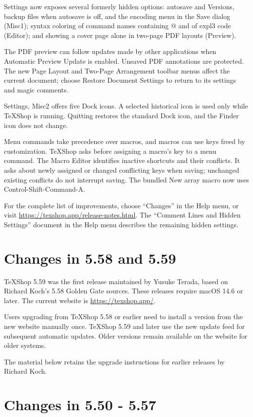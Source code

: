 \documentclass[11pt, oneside]{amsart}
\begin{document}
Settings now exposes several formerly hidden options: autosave and Versions, backup files when autosave is off, and the encoding menu in the Save dialog (Misc1); syntax coloring of command names containing @ and of expl3 code (Editor); and showing a cover page alone in two-page PDF layouts (Preview).

The PDF preview can follow updates made by other applications when Automatic Preview Update is enabled. Unsaved PDF annotations are protected. The new Page Layout and Two-Page Arrangement toolbar menus affect the current document; choose Restore Document Settings to return to its settings and magic comments.

Settings, Misc2 offers five Dock icons. A selected historical icon is used only while TeXShop is running. Quitting restores the standard Dock icon, and the Finder icon does not change.

Menu commands take precedence over macros, and macros can use keys freed by customization. TeXShop asks before assigning a macro's key to a menu command. The Macro Editor identifies inactive shortcuts and their conflicts. It asks about newly assigned or changed conflicting keys when saving; unchanged existing conflicts do not interrupt saving. The bundled New array macro now uses Control-Shift-Command-A.

For the complete list of improvements, choose ``Changes'' in the Help menu, or visit \url{https://texshop.app/release-notes.html}. The ``Comment Lines and Hidden Settings'' document in the Help menu describes the remaining hidden settings.

\section{Changes in 5.58 and 5.59}

TeXShop 5.59 was the first release maintained by Yusuke Terada, based on Richard Koch's 5.58 Golden Gate sources. These releases require macOS 14.6 or later. The current website is \url{https://texshop.app/}.

Users upgrading from TeXShop 5.58 or earlier need to install a version from the new website manually once. TeXShop 5.59 and later use the new update feed for subsequent automatic updates. Older versions remain available on the website for older systems.

The material below retains the upgrade instructions for earlier releases by Richard Koch.

\section{Changes in 5.50 - 5.57}
\end{document}
